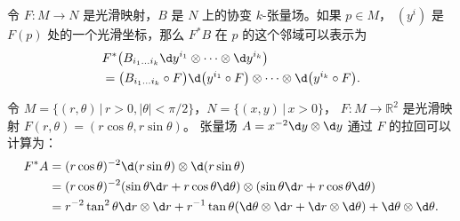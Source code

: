 \begin{corollary}
  令 $F:M\to N$ 是光滑映射，$B$ 是 $N$ 上的协变 $k$-张量场。如果 $p\in M$，
  $(y^i)$ 是 $F(p)$ 处的一个光滑坐标，那么 $F^*B$ 在 $p$ 的这个邻域可以表示为
  \begin{align*}
    &F^*\bigl(B_{i_1\dots i_k}\d y^{i_1}\otimes\cdots\otimes \d y^{i_k}\bigr)\\
    &=\bigl(B_{i_1\dots i_k}\circ F\bigr)
    \d\bigl(y^{i_1}\circ F\bigr)\otimes\cdots\otimes
    \d\bigl(y^{i_k}\circ F\bigr).
  \end{align*}
\end{corollary}

\begin{example}
  令 $M=\{(r,\theta)\,|\, r>0,|\theta|<\pi/2\}$，$N=\{(x,y)\,|\, x>0\}$，
  $F:M\to \mathbb{R}^2$ 是光滑映射 $F(r,\theta)=(r\cos\theta,r\sin\theta)$。
  张量场 $A=x^{-2}\d y\otimes\d y$ 通过 $F$ 的拉回可以计算为：
  \begin{align*}
    F^*A&=(r\cos\theta)^{-2}\d(r\sin\theta)\otimes\d (r\sin\theta)\\
    &=(r\cos\theta)^{-2}(\sin\theta\d r+r\cos\theta\d\theta)
    \otimes (\sin\theta\d r+r\cos\theta\d\theta)\\
    &=r^{-2}\tan^2\theta\d r\otimes\d r+
    r^{-1}\tan\theta(\d\theta\otimes\d r+\d r\otimes\d \theta)
    +\d\theta\otimes\d\theta.
  \end{align*}
\end{example}


